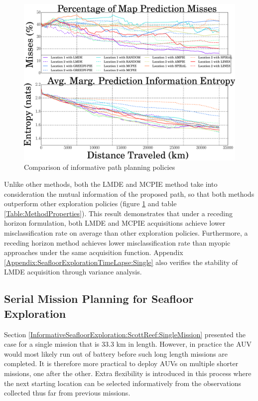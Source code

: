 			\begin{figure}[!htbp]
			\centering
				\includegraphics[width = 0.8\linewidth]{Figures/compare_methods.eps}
			\caption{Comparison of informative path planning policies}
			\label{Figure:CompareMethods}
			\end{figure}
				
			Unlike other methods, both the LMDE and MCPIE method take into consideration the mutual information of the proposed path, so that both methods outperform other exploration policies (figure \ref{Figure:CompareMethods} and table \ref{Table:MethodProperties}). This result demonstrates that under a receding horizon formulation, both LMDE and MCPIE acquisitions achieve lower misclassification rate on average than other exploration policies. Furthermore, a receding horizon method achieves lower misclassification rate than myopic approaches under the same acquisition function. Appendix \ref{Appendix:SeafloorExplorationTimeLapse:Single} also verifies the stability of LMDE acquisition through variance analysis.
				
		\subsection{Serial Mission Planning for Seafloor Exploration}
		\label{InformativeSeafloorExploration:ScottReef:SerialMission}
			
			Section \ref{InformativeSeafloorExploration:ScottReef:SingleMission} presented the case for a single mission that is 33.3 km in length. However, in practice the AUV would most likely run out of battery before such long length missions are completed. It is therefore more practical to deploy AUVs on multiple shorter missions, one after the other. Extra flexibility is introduced in this process where the next starting location can be selected informatively from the observations collected thus far from previous missions.
			
